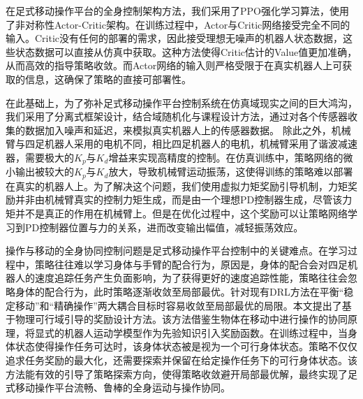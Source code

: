 在足式移动操作平台的全身控制架构方法，我们采用了PPO强化学习算法\cite{schulman2017proximalpolicyoptimizationalgorithms}，使用了非对称性Actor-Critic架构\cite{pinto2017asymmetricactorcriticimagebased}。在训练过程中，Actor与Critic网络接受完全不同的输入。Critic没有任何的部署的需求，因此接受理想无噪声的机器人状态数据，这些状态数据可以直接从仿真中获取。这种方法使得Critic估计的Value值更加准确，从而高效的指导策略收敛。而Actor网络的输入则严格受限于在真实机器人上可获取的信息，这确保了策略的直接可部署性。

在此基础上，为了弥补足式移动操作平台控制系统在仿真域现实之间的巨大鸿沟，我们采用了分离式框架设计，结合域随机化与课程设计方法，通过对各个传感器收集的数据加入噪声和延迟，来模拟真实机器人上的传感器数据。
除此之外，机械臂与四足机器人采用的电机不同，相比四足机器人的电机，机械臂采用了谐波减速器，需要极大的$K_p$与$K_d$增益来实现高精度的控制。在仿真训练中，策略网络的微小输出被较大的$K_p$与$K_d$放大，导致机械臂运动振荡，这使得训练的策略难以部署在真实的机器人上。为了解决这个问题，我们使用虚拟力矩奖励引导机制，力矩奖励并非由机械臂真实的控制力矩生成，而是由一个理想PD控制器生成，尽管该力矩并不是真正的作用在机械臂上。但是在优化过程中，这个奖励可以让策略网络学习到PD控制器位置与力的关系，进而改变输出幅值，减轻振荡效应。

操作与移动的全身协同控制问题是足式移动操作平台控制中的关键难点。在学习过程中，策略往往难以学习身体与手臂的配合行为，原因是，身体的配合会对四足机器人的速度追踪任务产生负面影响，为了获得更好的速度追踪性能，策略往往会忽略身体的配合行为，此时策略逐渐收敛至局部最优。针对现有DRL方法在平衡“稳定移动”和“精确操作”两大耦合目标时容易收敛至局部最优的局限。本文提出了基于物理可行域引导的奖励设计方法。该方法借鉴生物体在移动中进行操作的协同原理，将显式的机器人运动学模型作为先验知识引入奖励函数。在训练过程中，当身体状态使得操作任务可达时，该身体状态被是视为一个可行身体状态。策略不仅仅追求任务奖励的最大化，还需要探索并保留在给定操作任务下的可行身体状态。该方法能有效的引导了策略探索方向，使得策略收敛避开局部最优解，最终实现了足式移动操作平台流畅、鲁棒的全身运动与操作协同。


